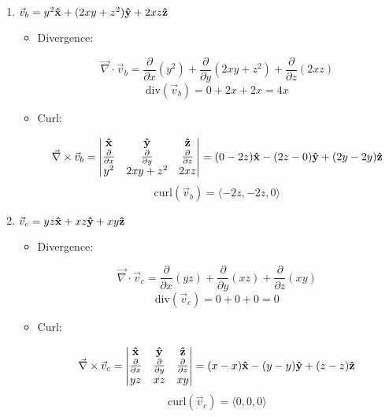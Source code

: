 \begin{enumerate}
\begin{enumerate}
\begin{itemize}
        \end{itemize}

      \item $\vec{v}_b=y^2\bold{\hat{x}}+(2xy+z^2)\bold{\hat{y}}+2xz\bold{\hat{z}}$

        \begin{itemize}

          \item Divergence:

            $$\vec{\nabla}\cdot\vec{v}_b=\frac{\partial}{\partial x}(y^2)+\frac{\partial}{\partial y}(2xy+z^2)+\frac{\partial}{\partial z}(2xz)$$
            $$\boxed{\text{div}(\vec{v}_b)=0+2x+2x=4x}$$

          \item Curl:

            $$\vec{\nabla}\times\vec{v}_b=\left|\begin{matrix} \bold{\hat{x}} & \bold{\hat{y}} & \bold{\hat{z}}\\ \frac{\partial}{\partial x} & \frac{\partial}{\partial y} & \frac{\partial}{\partial z} \\ y^2 & 2xy+z^2 & 2xz \end{matrix}\right|=(0-2z)\bold{\hat{x}}-(2z-0)\bold{\hat{y}}+(2y-2y)\bold{\hat{z}}$$
            $$\boxed{\text{curl}(\vec{v}_b)=\langle -2z, -2z, 0\rangle}$$

        \end{itemize}

      \item $\vec{v}_c=yz\bold{\hat{x}}+xz\bold{\hat{y}}+xy\bold{\hat{z}}$

        \begin{itemize}

          \item Divergence:

            $$\vec{\nabla}\cdot\vec{v}_c=\frac{\partial}{\partial x}(yz)+\frac{\partial}{\partial y}(xz)+\frac{\partial}{\partial z}(xy)$$
            $$\boxed{\text{div}(\vec{v}_c)=0+0+0=0}$$

          \item Curl:

            $$\vec{\nabla}\times\vec{v}_c=\left|\begin{matrix} \bold{\hat{x}} & \bold{\hat{y}} & \bold{\hat{z}}\\ \frac{\partial}{\partial x} & \frac{\partial}{\partial y} & \frac{\partial}{\partial z} \\ yz & xz & xy \end{matrix}\right|=(x-x)\bold{\hat{x}}-(y-y)\bold{\hat{y}}+(z-z)\bold{\hat{z}}$$
            $$\boxed{\text{curl}(\vec{v}_c)=\langle 0, 0, 0\rangle}$$


\end{itemize}
\end{enumerate}
\end{enumerate}
